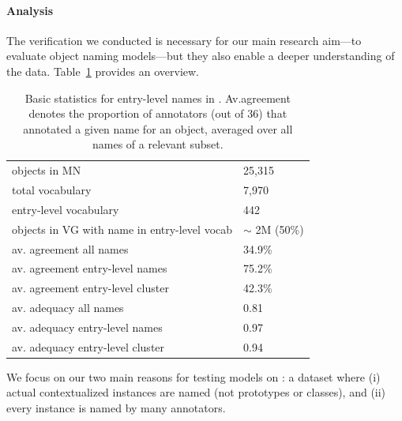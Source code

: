 

\paragraph{Analysis}
\label{sect:mn_analysis}

The verification we conducted is necessary for our main research aim---to evaluate  object naming models---but they also enable a deeper understanding of the \mn data.
Table~\ref{tab:stat-entry-level} provides an overview.
\begin{table}[t]
	\centering
	\small
	\begin{tabular}{p{5cm}l}
		\toprule		
		objects in MN & 25,315\\
		total vocabulary &  7,970\\
		entry-level vocabulary & 442\\
		objects in VG with name in entry-level vocab & $\sim$ 2M (50\%)\\
		\midrule
		av. agreement all names & 34.9\%\\
		av. agreement entry-level names & 75.2\%\\
		av. agreement entry-level cluster & 42.3\%\\
		\midrule
		av. adequacy all names & 0.81\\
		av. adequacy entry-level names & 0.97 \\
		av. adequacy entry-level cluster & 0.94 \\
		\bottomrule	
	\end{tabular}
	\caption{Basic statistics for entry-level names in \mn. Av.agreement denotes the proportion of annotators (out of 36) that annotated a given name for an object, averaged over all names of a relevant subset.}
	\label{tab:stat-entry-level}
\end{table}
We focus on our two main reasons for testing models on \mn: a dataset where (i) actual contextualized instances are named (not prototypes or classes), and (ii) every instance is named by many annotators.

